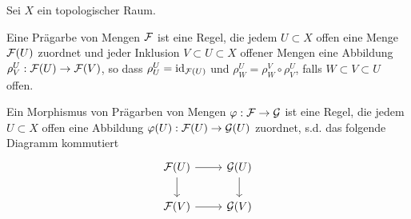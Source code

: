 Sei $X$ ein topologischer Raum. 
\begin{defn}
    Eine Prägarbe von Mengen $\mathcal{F}$ ist eine Regel, die jedem $U\subset X$ offen eine Menge
    $\mathcal{F}(U)$ zuordnet und jeder Inklusion $V\subset U\subset X$ offener Mengen eine Abbildung
    $\rho^U_V:\mathcal{F}(U)\to \mathcal{F}(V)$, so dass $\rho^U_U=\operatorname{id}_{\mathcal{F}(U)}$ und $\rho^U_W = \rho^V_W\circ \rho^U_V$, falls $W\subset V\subset U$ offen.
\end{defn}
\begin{defn}
    Ein Morphismus von Prägarben von Mengen $\varphi:\mathcal{F}\to \mathcal{G}$ ist eine Regel, die jedem $U\subset X$ offen eine Abbildung $\varphi(U):\mathcal{F}(U)\to \mathcal{G}(U)$ zuordnet, s.d. das folgende Diagramm
    kommutiert 
    \[
    \begin{tikzcd}
        \cali{F}(U) \arrow[r]\arrow[d] & \cali{G}(U)\arrow[d] \\
        \cali{F}(V) \arrow[r]& \cali{G}(V)
    \end{tikzcd}    
    \] 
\end{defn}